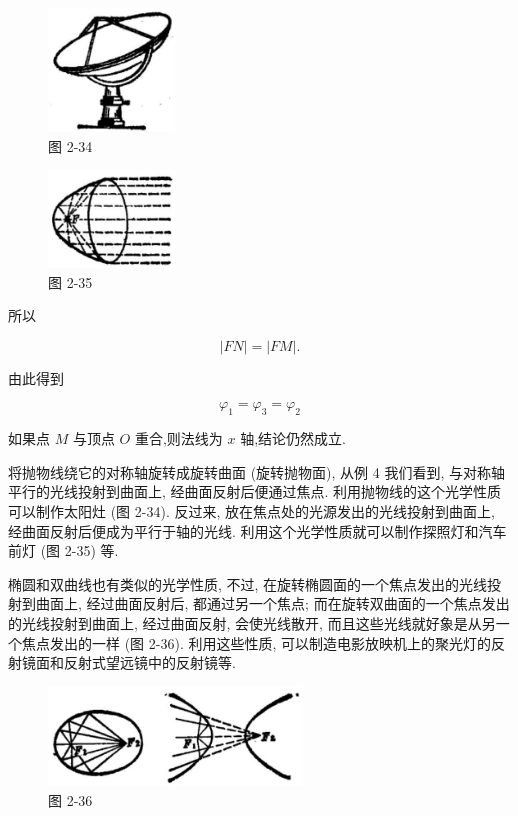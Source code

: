 \documentclass[lang=cn,newtx,12pt,scheme=chinese]{elegantbook}
\begin{document}
\begin{figure}[h]
  \centering
  \includegraphics[max width=0.3\textwidth]{images/01912cc2-ffb6-728e-9ae7-b113ff05c64b_123_742628.jpg}
  \caption{图 2-34}
\end{figure}

\begin{figure}[h]
  \centering
  \includegraphics[max width=0.3\textwidth]{images/01912cc2-ffb6-728e-9ae7-b113ff05c64b_123_478254.jpg}
  \caption{图 2-35}
\end{figure}

所以

\[
  \left| {FN}\right| = \left| {FM}\right| \text{.}
\]

由此得到

\[
    {\varphi }_{1} = {\varphi }_{3} = {\varphi }_{2}
\]

如果点 \(M\) 与顶点 \(O\) 重合,则法线为 \(x\) 轴,结论仍然成立.

将抛物线绕它的对称轴旋转成旋转曲面 (旋转抛物面), 从例 4 我们看到, 与对称轴平行的光线投射到曲面上, 经曲面反射后便通过焦点. 利用抛物线的这个光学性质可以制作太阳灶 (图 2-34). 反过来, 放在焦点处的光源发出的光线投射到曲面上, 经曲面反射后便成为平行于轴的光线. 利用这个光学性质就可以制作探照灯和汽车前灯 (图 2-35) 等.

椭圆和双曲线也有类似的光学性质, 不过, 在旋转椭圆面的一个焦点发出的光线投射到曲面上, 经过曲面反射后, 都通过另一个焦点; 而在旋转双曲面的一个焦点发出的光线投射到曲面上, 经过曲面反射, 会使光线散开, 而且这些光线就好象是从另一个焦点发出的一样 (图 2-36). 利用这些性质, 可以制造电影放映机上的聚光灯的反射镜面和反射式望远镜中的反射镜等.

\begin{figure}[h]
  \centering
  \includegraphics[max width=0.6\textwidth]{images/01912cc2-ffb6-728e-9ae7-b113ff05c64b_124_448954.jpg}
  \caption{图 2-36}
\end{figure}
\end{document}
